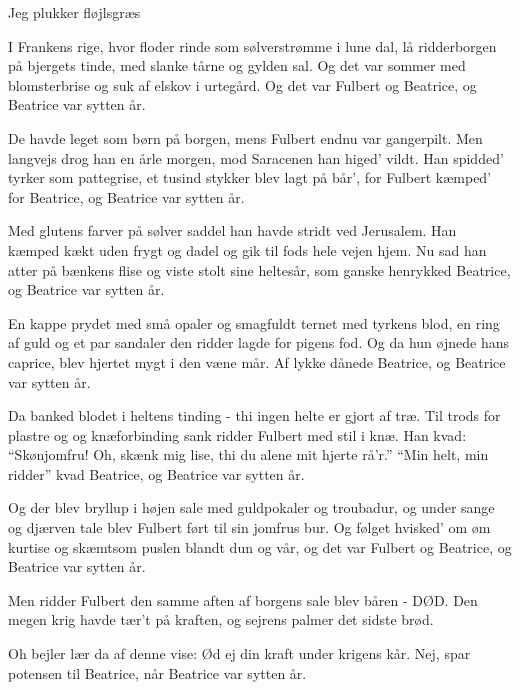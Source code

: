 {Jeg plukker fløjlsgræs}
{}
{
I Frankens rige, hvor floder rinde
som sølverstrømme i lune dal,
lå ridderborgen på bjergets tinde,
med slanke tårne og gylden sal.
Og det var sommer med blomsterbrise
og suk af elskov i urtegård.
Og det var Fulbert og Beatrice,
og Beatrice var sytten år.

De havde leget som børn på borgen,
mens Fulbert endnu var gangerpilt.
Men langvejs drog han en årle morgen,
mod Saracenen han higed' vildt.
Han spidded' tyrker som pattegrise,
et tusind stykker blev lagt på bår',
for Fulbert kæmped' for Beatrice,
og Beatrice var sytten år.

Med glutens farver på sølver saddel
han havde stridt ved Jerusalem.
Han kæmped kækt uden frygt og dadel
og gik til fods hele vejen hjem.
Nu sad han atter på bænkens flise
og viste stolt sine heltesår,
som ganske henrykked Beatrice,
og Beatrice var sytten år.

En kappe prydet med små opaler
og smagfuldt ternet med tyrkens blod,
en ring af guld og et par sandaler
den ridder lagde for pigens fod.
Og da hun øjnede hans caprice,
blev hjertet mygt i den væne mår.
Af lykke dånede Beatrice,
og Beatrice var sytten år. 

Da banked blodet i heltens tinding -
thi ingen helte er gjort af træ.
Til trods for plastre og og knæforbinding
sank ridder Fulbert med stil i knæ.
Han kvad: ``Skønjomfru! Oh, skænk mig lise,
thi du alene mit hjerte rå'r.''
``Min helt, min ridder'' kvad Beatrice,
og Beatrice var sytten år.

Og der blev bryllup i højen sale
med guldpokaler og troubadur,
og under sange og djærven tale
blev Fulbert ført til sin jomfrus bur.
Og følget hvisked' om øm kurtise
og skæmtsom puslen blandt dun og vår,
og det var Fulbert og Beatrice, 
og Beatrice var sytten år. 


Men ridder Fulbert den samme aften
af borgens sale blev båren - DØD.
Den megen krig havde tær't på kraften,
og sejrens palmer det sidste brød.


Oh bejler lær da af denne vise:
Ød ej din kraft under krigens kår.
Nej, spar potensen til Beatrice,
når Beatrice var sytten år.
}
